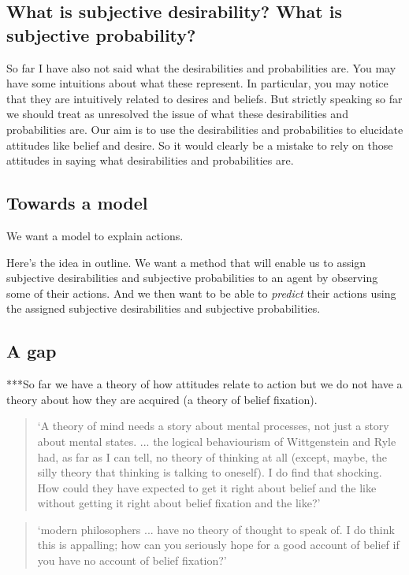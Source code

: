 \documentclass[12pt,\papersize]{extarticle}
\begin{document}
 


\subsection{What is subjective desirability?  What is subjective probability?}
So far I have also not said what the desirabilities and probabilities are.
You may have some intuitions about what these represent.
In particular,  you may notice that they are intuitively related to desires and beliefs.
But strictly speaking so far we should treat as unresolved the issue of what these desirabilities and probabilities are.
Our aim is to use the desirabilities and probabilities to elucidate attitudes like belief and desire.
So it would clearly be a mistake to rely on those attitudes in saying what desirabilities and probabilities are.



\subsection{Towards a model}
We want  a model to explain actions.

Here's the idea in outline.
We want a method that will enable us to assign subjective desirabilities and subjective probabilities to an agent by observing some of their actions.
And we then want to be able to \emph{predict} their actions using the assigned subjective desirabilities and subjective probabilities.



\subsection{A gap}
***So far we have a theory of how attitudes relate to action but we do not have a theory about how they are acquired (a theory of belief fixation).
\begin{quote}
`A theory of mind needs a story about mental processes, not just a story about mental states. ... the logical behaviourism of Wittgenstein and Ryle had, as far as I can tell, no theory of thinking at all (except, maybe, the silly theory that thinking is talking to oneself). I do find that shocking. How could they have expected to get it right about belief and the like without getting it right about belief fixation and the like?' \citep[p.\ 9--10]{Fodor:1998ap}
\end{quote}
\begin{quote}
`modern philosophers ... have no theory of thought to speak of. I do think this is appalling; how can you seriously hope for a good account of belief if you have no account of belief fixation?' 
\citep[p.\ 147]{Fodor:1987rt}
\end{quote}




\small

\end{document}

